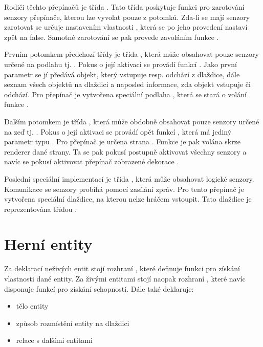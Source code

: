 Rodiči těchto přepínačů je třída . Tato třída poskytuje funkci pro zarotování senzory přepínače, kterou
lze vyvolat pouze z potomků. Zda-li se mají senzory zarotovat se určuje nastavením vlastnosti , která se po jeho 
provedení nastaví zpět na false. Samotné zarotování se pak provede zavoláním funkce .

Prvním potomkem předchozí třídy je třída , která může obsahovat pouze senzory určené
na podlahu tj. . Pokus o její aktivaci se provádí funkcí . Jako první parametr se jí předává objekt,
který vstupuje resp. odchází z dlaždice, dále seznam všech objektů na dlaždici a naposled informace, zda objekt
vstupuje či odchází. Pro přepínač je vytvořena speciální podlaha , která se stará 
o volání funkce .

Dalším potomkem je třída , která může obdobně obsahovat pouze senzory určené na zeď tj. .
Pokus o její aktivaci se provádí opět funkcí , která má jediný parametr typu . Pro přepínač
je určena strana . Funkce  je pak volána skrze renderer dané strany. 
Ta se pak pokusí postupně aktivovat všechny senzory a navíc se pokusí aktivovat přepínač zobrazené dekorace .


Poslední speciální implementací je třída , která může obsahovat logické senzory.
Komunikace se senzory probíhá pomocí zasílání zpráv. Pro tento přepínač je vytvořena speciální dlaždice,
na kterou nelze hráčem vstoupit. Tato dlaždice je reprezentována třídou . 


\section{Herní entity}

Za deklarací neživých entit stojí rozhraní , které definuje funkci  pro získání vlastnosti dané entity.
Za živými entitami stojí naopak rozhraní , které navíc disponuje funkcí  pro získání schopností. Dále
také deklaruje:

\begin{itemize}
\item tělo entity
\item způsob rozmístění entity na dlaždici
\item relace s dalšími entitami
\end{itemize}

